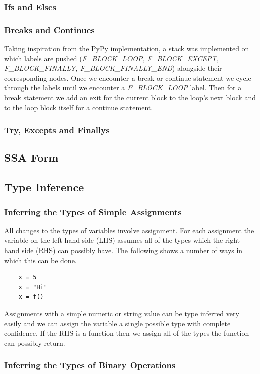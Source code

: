 \documentclass[12pt, titlepage]{article}
\begin{document}
\subsubsection{Ifs and Elses}


\subsubsection{Breaks and Continues} 
Taking inspiration from the PyPy implementation, a stack was implemented on which labels are pushed (\textit{F\_BLOCK\_LOOP, F\_BLOCK\_EXCEPT, F\_BLOCK\_FINALLY, F\_BLOCK\_FINALLY\_END}) alongside their corresponding nodes. Once we encounter a break or continue statement we cycle through the labels until we encounter a \textit{F\_BLOCK\_LOOP} label. Then for a break statement we add an exit for the current block to the loop's next block and to the loop block itself for a continue statement.

\subsubsection{Try, Excepts and Finallys} 

\subsection{SSA Form}

\subsection{Type Inference}

\subsubsection{Inferring the Types of Simple Assignments}
All changes to the types of variables involve assignment. For each assignment the variable on the left-hand side (LHS) assumes all of the types which the right-hand side (RHS) can possibly have. The following shows a number of ways in which this can be done.
\begin{lstlisting}
	x = 5
	x = "Hi"
	x = f()
\end{lstlisting}
Assignments with a simple numeric or string value can be type inferred very easily and we can assign the variable a single possible type with complete confidence. If the RHS is a function then we assign all of the types the function can possibly return.

\subsubsection{Inferring the Types of Binary Operations}
\end{document}
